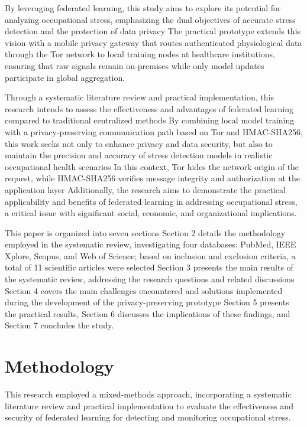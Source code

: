 \documentclass[12pt]{article}
\begin{document}
By leveraging federated learning, this study aims to explore its potential for analyzing occupational stress, emphasizing the dual objectives of accurate stress detection and the protection of data privacy The practical prototype extends this vision with a mobile privacy gateway that routes authenticated physiological data through the Tor network to local training nodes at healthcare institutions, ensuring that raw signals remain on-premises while only model updates participate in global aggregation.

Through a systematic literature review and practical implementation, this research intends to assess the effectiveness and advantages of federated learning compared to traditional centralized methods By combining local model training with a privacy-preserving communication path based on Tor and HMAC-SHA256, this work seeks not only to enhance privacy and data security, but also to maintain the precision and accuracy of stress detection models in realistic occupational health scenarios In this context, Tor hides the network origin of the request, while HMAC-SHA256 verifies message integrity and authorization at the application layer Additionally, the research aims to demonstrate the practical applicability and benefits of federated learning in addressing occupational stress, a critical issue with significant social, economic, and organizational implications.

This paper is organized into seven sections Section 2 details the methodology employed in the systematic review, investigating four databases: PubMed, IEEE Xplore, Scopus, and Web of Science; based on inclusion and exclusion criteria, a total of 11 scientific articles were selected Section 3 presents the main results of the systematic review, addressing the research questions and related discussions Section 4 covers the main challenges encountered and solutions implemented during the development of the privacy-preserving prototype Section 5 presents the practical results, Section 6 discusses the implications of these findings, and Section 7 concludes the study.

\section{Methodology}

This research employed a mixed-methods approach, incorporating a systematic literature review and practical implementation to evaluate the effectiveness and security of federated learning for detecting and monitoring occupational stress.
\end{document}
